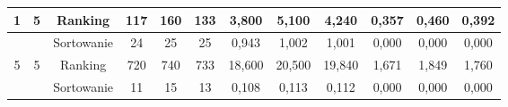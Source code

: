 \documentclass[licencjacka]{pracamgr}
\begin{document}
\begin{table}[H]
{\begin{tabular}{@{}cccccccccccc@{}}
1                                                               & 5                                                       & Ranking    & 117                                                     & 160                                                     & 133                                                        & 3,800                                                      & 5,100                                                      & 4,240                                                          & 0,357                                                              & 0,460                                                               & 0,392                                                                  \\ \midrule
                                                                &                                                         & Sortowanie & 24                                                      & 25                                                      & 25                                                         & 0,943                                                      & 1,002                                                      & 1,001                                                          & 0,000                                                              & 0,000                                                               & 0,000                                                                  \\
5                                                               & 5                                                       & Ranking    & 720                                                     & 740                                                     & 733                                                        & 18,600                                                     & 20,500                                                     & 19,840                                                         & 1,671                                                              & 1,849                                                               & 1,760                                                                  \\ \midrule
                                                                &                                                         & Sortowanie & 11                                                      & 15                                                      & 13                                                         & 0,108                                                      & 0,113                                                      & 0,112                                                          & 0,000                                                              & 0,000                                                               & 0,000                                                                  \\

\end{tabular}}
\end{table}
\end{document}
